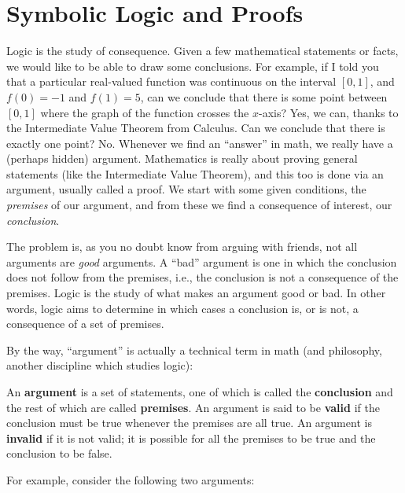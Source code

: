 \documentclass[12pt,]{book}
\newcommand{\terminology}[1]{\textbf{#1}}
\theoremstyle{plain}
\theoremstyle{definition}
\theoremstyle{definition}
\theoremstyle{definition}
\numberwithin{equation}{chapter}
\begin{document}
\chapter[{Symbolic Logic and Proofs}]{Symbolic Logic and Proofs}\label{ch_logic}
\hypertarget{p-1013}{}%
Logic is the study of consequence. Given a few mathematical statements or facts, we would like to be able to draw some conclusions. For example, if I told you that a particular real-valued function was continuous on the interval \([0,1]\), and \(f(0) = -1\) and \(f(1) = 5\), can we conclude that there is some point between \([0,1]\) where the graph of the function crosses the \(x\)-axis? Yes, we can, thanks to the Intermediate Value Theorem from Calculus. Can we conclude that there is exactly one point? No. Whenever we find an ``answer'' in math, we really have a (perhaps hidden) argument. Mathematics is really about proving general statements (like the Intermediate Value Theorem), and this too is done via an argument, usually called a proof. We start with some given conditions, the \emph{premises} of our argument, and from these we find a consequence of interest, our \emph{conclusion}.%
\par
\hypertarget{p-1014}{}%
The problem is, as you no doubt know from arguing with friends, not all arguments are \emph{good} arguments. A ``bad'' argument is one in which the conclusion does not follow from the premises, i.e., the conclusion is not a consequence of the premises. Logic is the study of what makes an argument good or bad. In other words, logic aims to determine in which cases a conclusion is, or is not, a consequence of a set of premises.%
\par
\hypertarget{p-1015}{}%
By the way, ``argument'' is actually a technical term in math (and philosophy, another discipline which studies logic):%
\begin{assemblage}[Arguments]\label{assemblage-24}
\hypertarget{p-1016}{}%
An \terminology{argument} is a set of statements, one of which is called the \terminology{conclusion} and the rest of which are called \terminology{premises}. An argument is said to be \terminology{valid} if the conclusion must be true whenever the premises are all true. An argument is \terminology{invalid} if it is not valid; it is possible for all the premises to be true and the conclusion to be false.%
\end{assemblage}
\hypertarget{p-1017}{}%
For example, consider the following two arguments:%
\end{document}

